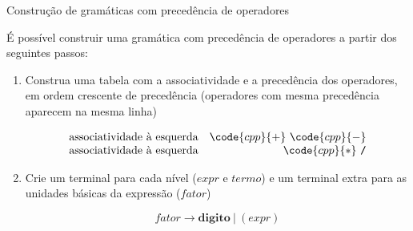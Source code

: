 \begin{frame}[fragile]{Construção de gramáticas com precedência de operadores}

    É possível construir uma gramática com precedência de operadores a partir dos seguintes passos:
    \pause

    \vspace{0.2in}

    \begin{enumerate}
        \item Construa uma tabela com a associatividade e a precedência dos operadores, em ordem crescente de precedência (operadores com mesma precedência 
            aparecem na mesma linha)
        \pause
        \begin{footnotesize}
        \[
            \begin{array}{lr}
                \mbox{associatividade à esquerda} & \code{cpp}{+}\ \code{cpp}{-} \\
                \mbox{associatividade à esquerda} & \code{cpp}{*}\ \texttt{/} \\
            \end{array}
        \]
        \end{footnotesize}
        \pause
       
        \item Crie um terminal para cada nível ($expr$ e $termo$) e um terminal extra para as unidades básicas da expressão ($fator$)
        \pause
        \begin{footnotesize}
        \[
            fator \to \mathbf{digito}\ |\ (expr)
        \]
        \end{footnotesize}
 
    \end{enumerate}

\end{frame}

